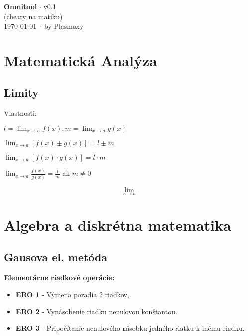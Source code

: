 \documentclass[10pt,a4paper]{article}
\newcommand{\lima}{\lim_{x\to a}}
\begin{document}
	\begin{center}
		\Large{\textbf{Omnitool} $\cdot$ v0.1}\\
		(cheaty na matiku)\\
		\today\ $\cdot$ by Plasmoxy
	\end{center}

	\section{Matematická Analýza}
		
	\subsection{Limity}
	Vlastnosti:
		
	\begin{multicols}{2}
		\par$ l = \lima f(x), m = \lima g(x) $
		\par$ \lima[f(x)\pm g(x)] = l \pm m $
		\par$ \lima[f(x) \cdot g(x)] = l \cdot m $
		\par$ \lima\frac{f(x)}{g(x)} = \frac{l}{m}$ ak $m\neq 0 $
		
		
		\columnbreak
		$$ \lim_{x\to{a}} $$
	\end{multicols}
			
	\section{Algebra a diskrétna matematika}
	
	\subsection{Gausova el. metóda}
	\textbf{Elementárne riadkové operácie:}
	\begin{itemize}
		\item \textbf{ERO 1} - Výmena poradia 2 riadkov,
		\item \textbf{ERO 2} - Vynásobenie riadku nenulovou konštantou.
		\item \textbf{ERO 3} - Pripočítanie nenulového násobku jedného riatku k inému riadku.
	\end{itemize}
	
	
\end{document}
